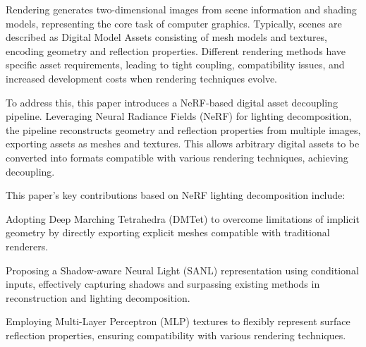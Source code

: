 \begin{abstract*}

  Rendering generates two-dimensional images from scene information and shading models, 
  representing the core task of computer graphics. Typically, 
  scenes are described as Digital Model Assets consisting of mesh models and textures, 
  encoding geometry and reflection properties. Different rendering methods have specific asset requirements, 
  leading to tight coupling, compatibility issues, and increased development costs when rendering techniques evolve.

  To address this, this paper introduces a NeRF-based digital asset decoupling pipeline. 
  Leveraging Neural Radiance Fields (NeRF) for lighting decomposition, 
  the pipeline reconstructs geometry and reflection properties from multiple images, 
  exporting assets as meshes and textures. 
  This allows arbitrary digital assets to be converted into formats compatible with various rendering techniques, 
  achieving decoupling.
  
  This paper's key contributions based on NeRF lighting decomposition include:
  
  Adopting Deep Marching Tetrahedra (DMTet) to overcome limitations of implicit geometry by directly exporting explicit meshes compatible with traditional renderers.
  
  Proposing a Shadow-aware Neural Light (SANL) representation using conditional inputs, effectively capturing shadows and surpassing existing methods in reconstruction and lighting decomposition.
  
  Employing Multi-Layer Perceptron (MLP) textures to flexibly represent surface reflection properties, ensuring compatibility with various rendering techniques.
  
\end{abstract*}
